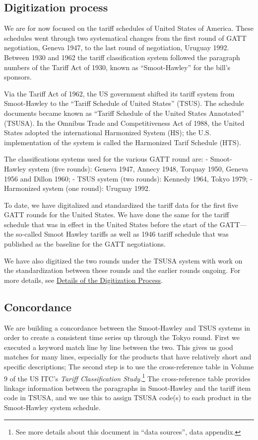 \documentclass[
  12pt,
]{article}
\begin{document}
\hypertarget{digitization-process}{%
\subsection{Digitization process}\label{digitization-process}}

We are for now focused on the tariff schedules of United States of America. These schedules went through two systematical changes from the first round of GATT negotiation, Geneva 1947, to the last round of negotiation, Uruguay 1992. Between 1930 and 1962 the tariff classification system followed the paragraph numbers of the Tariff Act of 1930, known as ``Smoot-Hawley'' for the bill's sponsors.

Via the Tariff Act of 1962, the US government shifted its tariff system from Smoot-Hawley to the ``Tariff Schedule of United States'' (TSUS). The schedule documents became known as ``Tariff Schedule of the United States Annotated'' (TSUSA). In the Omnibus Trade and Competitiveness Act of 1988, the United States adopted the international Harmonized System (HS); the U.S. implementation of the system is called the Harmonized Tarif Schedule (HTS).

The classifications systems used for the various GATT round are:
- Smoot-Hawley system (five rounds): Geneva 1947, Annecy 1948, Torquay 1950, Geneva 1956 and Dillon 1960;
- TSUS system (two rounds): Kennedy 1964, Tokyo 1979;
- Harmonized system (one round): Uruguay 1992.

To date, we have digitalized and standardized the tariff data for the first five GATT rounds for the United States. We have done the same for the tariff schedule that was in effect in the United States before the start of the GATT---the so-called Smoot Hawley tariffs as well as 1946 tariff schedule that was published as the baseline for the GATT negotiations.

We have also digitized the two rounds under the TSUSA system with work on the standardization between these rounds and the earlier rounds ongoing. For more details, see \protect\hyperlink{digdetails}{Details of the Digitization Process}.

\hypertarget{concordance}{%
\subsection{Concordance}\label{concordance}}

We are building a concordance between the Smoot-Hawley and TSUS systems in order to create a consistent time series up through the Tokyo round. First we executed a keyword match line by line between the two. This gives us good matches for many lines, especially for the products that have relatively short and specific descriptions; The second step is to use the cross-reference table in Volume 9 of the US ITC's \emph{Tariff Classification Study.}\footnote{See more details about this document in ``data sources'', data appendix.} The cross-reference table provides linkage information between the paragraphs in Smoot-Hawley and the tariff item code in TSUSA, and we use this to assign TSUSA code(s) to each product in the Smoot-Hawley system schedule.
\end{document}
